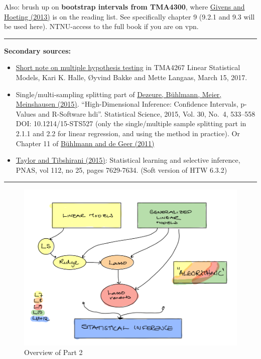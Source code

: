 \documentclass[
  letterpaper,
  DIV=11,
  numbers=noendperiod]{scrartcl}
\begin{document}
Also: brush up on \textbf{bootstrap intervals from TMA4300}, where
\href{https://onlinelibrary.wiley.com/doi/book/10.1002/9781118555552}{Givens
and Hoeting (2013)} is on the reading list. See specifically chapter 9
(9.2.1 and 9.3 will be used here). NTNU-access to the full book if you
are on vpn.

\begin{center}\rule{0.5\linewidth}{0.5pt}\end{center}

\textbf{Secondary sources:}

\begin{itemize}
\item
  \href{https://www.math.ntnu.no/emner/TMA4267/2017v/multtest.pdf}{Short
  note on multiple hypothesis testing} in TMA4267 Linear Statistical
  Models, Kari K. Halle, Øyvind Bakke and Mette Langaas, March 15, 2017.
\item
  Single/multi-sampling splitting part of
  \href{https://projecteuclid.org/download/pdfview_1/euclid.ss/1449670857}{Dezeure,
  Bühlmann, Meier, Meinshausen (2015)}. ``High-Dimensional Inference:
  Confidence Intervals, p-Values and R-Software hdi''. Statistical
  Science, 2015, Vol. 30, No.~4, 533--558 DOI: 10.1214/15-STS527 (only
  the single/multiple sample splitting part in 2.1.1 and 2.2 for linear
  regression, and using the method in practice). Or Chapter 11 of
  \href{https://link.springer.com/book/10.1007/978-3-642-20192-9}{Bühlmann
  and de Geer (2011)}
\item
  \href{https://www.pnas.org/content/112/25/7629}{Taylor and Tibshirani
  (2015)}: Statistical learning and selective inference, PNAS, vol 112,
  no 25, pages 7629-7634. (Soft version of HTW 6.3.2)
\end{itemize}

\begin{center}\rule{0.5\linewidth}{0.5pt}\end{center}

\begin{figure}

{\centering \includegraphics[width=1\textwidth,height=\textheight]{./P2overview.png}

}

\caption{Overview of Part 2}

\end{figure}
\end{document}
